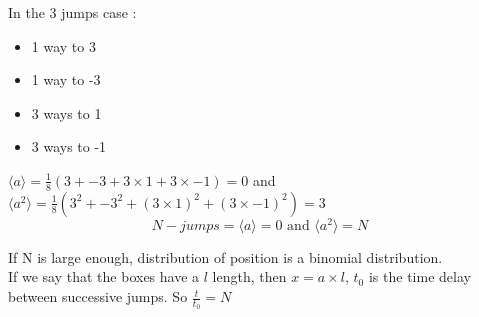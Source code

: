 \documentclass[10pt,a4paper]{article}
\begin{document}
In the 3 jumps case :
\begin{itemize}
    \item 1 way to 3
    \item 1 way to -3
    \item 3 ways to 1
    \item 3 ways to -1
\end{itemize}
$\langle a \rangle = \frac{1}{8}( 3 + {-3} + 3 \times 1 + 3\times {-1} ) = 0$ and $\langle a^2 \rangle = \frac{1}{8}( 3^2 + {-3}^2 + (3 \times 1)^2 + (3\times {-1})^2 )=3$\\

\[ N-jumps = \langle a \rangle = 0\text{ and }\langle a^2 \rangle = N\]

If N is large enough, distribution of position is a binomial distribution.\\

If we say that the boxes have a $l$ length, then $x = a \times l$, $t_0$ is the time delay between successive jumps. So $\frac{t}
{t_0} = N$
\end{document}

